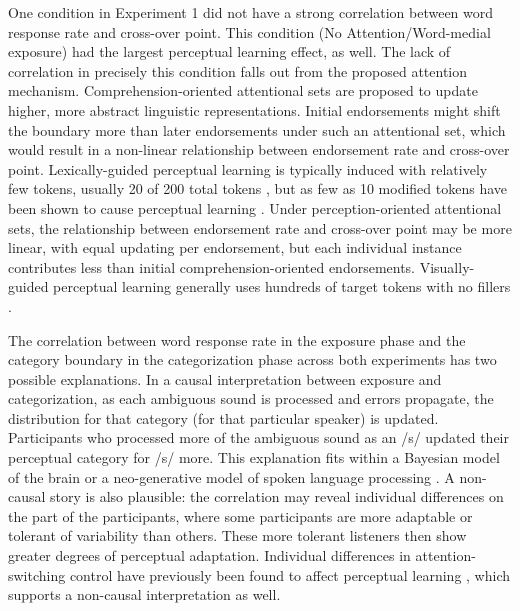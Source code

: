 One condition in Experiment 1 did not have a strong correlation between word response rate and cross-over point.
This condition (No Attention/Word-medial exposure) had the largest perceptual learning effect, as well.
The lack of correlation in precisely this condition falls out from the proposed attention mechanism.
Comprehension-oriented attentional sets are proposed to update higher, more abstract linguistic representations.
Initial endorsements might shift the boundary more than later endorsements under such an attentional set, which would result in a non-linear relationship between endorsement rate and cross-over point.
Lexically-guided perceptual learning is typically induced with relatively few tokens, usually 20 of 200 total tokens \citep{Norris2003, Reinisch2013}, but as few as 10 modified tokens have been shown to cause perceptual learning \citep{Kraljic2008}.
Under perception-oriented attentional sets, the relationship between endorsement rate and cross-over point may be more linear, with equal updating per endorsement, but each individual instance contributes less than initial comprehension-oriented endorsements.
Visually-guided perceptual learning generally uses hundreds of target tokens with no fillers \citep{Vroomen2007, Reinisch2014}.

The correlation between word response rate in the exposure phase and the category boundary in the categorization phase across both experiments has two possible explanations. 
In a causal interpretation between exposure and categorization, as each ambiguous sound is processed and errors propagate, the distribution for that category (for that particular speaker) is updated.
Participants who processed more of the ambiguous sound as an /s/ updated their perceptual category for /s/ more. 
This explanation fits within a Bayesian model of the brain \citep{Clark2013} or a neo-generative model of spoken language processing \citep{Pierrehumbert2002}.  
A non-causal story is also plausible:  the correlation may reveal individual differences on the part of the participants, where some participants are more adaptable or tolerant of variability than others.
These more tolerant listeners then show greater degrees of perceptual adaptation. 
Individual differences in attention-switching control have previously been found to affect perceptual learning \citep{Scharenborg2014}, which supports a non-causal interpretation as well.

